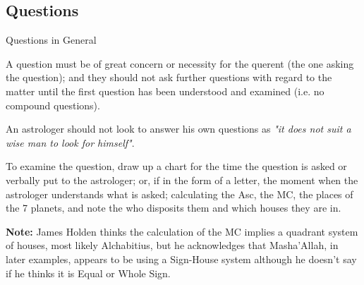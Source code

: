 \subsection{Questions}
\begin{frame}[t]{Questions in General}

A question must be of great concern or necessity for the querent (the one asking the question); and they should not ask further questions with regard to the matter until the first question has been understood and examined (i.e. no compound questions).

An astrologer should not look to answer his own questions as \textsl{"it does not suit a wise man to look for himself"}. 

To examine the question, draw up a chart for the time the question is asked or verbally put to the astrologer; or, if in the form of a letter, the moment when the astrologer understands what is asked; calculating the Asc, the MC, the places of the 7 planets, and note the who disposits them and which houses they are in.
\vspace{0.5cm}
\begin{mdframed}[backgroundcolor=gray!5, rightmargin=2em, leftmargin=2em]
\textbf{Note:} James Holden thinks the calculation of the MC implies a quadrant system of houses, most likely Alchabitius, but he acknowledges that Masha'Allah, in later examples, appears to be using a Sign-House system although he doesn't say if he thinks it is Equal or Whole Sign.
\end{mdframed}

\end{frame}